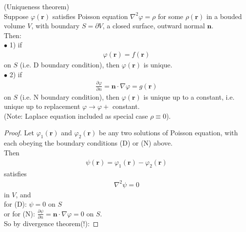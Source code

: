 \documentclass[a4paper]{article}
\begin{document}
\begin{thm} (Uniqueness theorem)\\
Suppose $\varphi\left(\mathbf{r}\right)$ satisfies Poisson equation $\nabla^2\varphi = \rho$ for some $\rho\left(\mathbf{r}\right)$ in a bouded volume $V$, with boundary $S=\partial V$, a closed surface, outward normal $\mathbf{n}$.\\
Then:\\
$\bullet$ 1) if
\begin{equation*}
\begin{aligned}
\varphi\left(\mathbf{r}\right) = f\left(\mathbf{r}\right)
\end{aligned}
\end{equation*}
on $S$ (i.e. D boundary condition), then $\varphi\left(\mathbf{r}\right)$ is unique.\\
$\bullet$ 2) if
\begin{equation*}
\begin{aligned}
\frac{\partial \varphi}{\partial n} = \mathbf{n}\cdot\nabla\varphi = g\left(\mathbf{r}\right)
\end{aligned}
\end{equation*}
on $S$ (i.e. N boundary condition), then $\varphi\left(\mathbf{r}\right)$ is unique up to a constant, i.e. unique up to replacement $\varphi \to \varphi +$ constant.\\
(Note: Laplace equation included as special case $\rho \equiv 0$).
\begin{proof}
Let $\varphi_1\left(\mathbf{r}\right)$ and $\varphi_2\left(\mathbf{r}\right)$ be any two solutions of Poisson equation, with each obeying the boundary conditions (D) or (N) above.\\
Then
\begin{equation*}
\begin{aligned}
\psi\left(\mathbf{r}\right)=\varphi_1\left(\mathbf{r}\right)-\varphi_2\left(\mathbf{r}\right)
\end{aligned}
\end{equation*}
satisfies
\begin{equation*}
\begin{aligned}
\nabla^2\psi = 0
\end{aligned}
\end{equation*}
in $V$, and\\
for (D): $\psi = 0$ on $S$\\
or for (N): $\frac{\partial\psi}{\partial n}=\mathbf{n}\cdot\nabla\varphi = 0$ on $S$.\\
So by divergence theorem(!):

\end{proof}
\end{thm}
\end{document}
